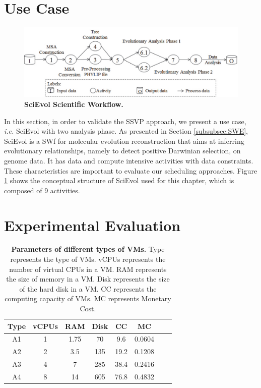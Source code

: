 \section{Use Case}
\label{sec:PUC}

\begin{figure}[htbp]
\begin{centering}
\captionsetup{justification=centering}
\includegraphics[width=140mm]{figures/pscievol}
\par\end{centering}
\caption{\textbf{SciEvol Scientific Workflow. }}
\label{fig:pscievol}
\end{figure}

In this section, in order to validate the SSVP approach, we present a use case, \textit{i.e.} SciEvol with two analysis phase.
As presented in Section \ref{subsubsec:SWE}, SciEvol \cite{Ocana2012} is a SWf for molecular evolution reconstruction that aims at inferring evolutionary relationships, namely to detect positive Darwinian selection, on genome data. It has data and compute intensive activities with data constraints. These characteristics are important to evaluate our scheduling approaches. Figure \ref{fig:pscievol} shows the conceptual structure of SciEvol used for this chapter, which is composed of $9$ activities.


\section{Experimental Evaluation}
\label{sec:PVal}


\begin{table}[htbp]
\caption{\textbf{Parameters of different types of VMs. } Type represents the type of VMs. vCPUs represents the number of virtual CPUs in a VM. RAM represents the size of memory in a VM. Disk represents the size of the hard disk in a VM. CC represents the computing capacity of VMs. MC represents Monetary Cost.} 
\label{tab:pVMP}
\begin{centering}
\captionsetup{justification=centering}
\begin{tabular}{|c|c|c|c|c|c|c|c|}
\hline 
Type & vCPUs & RAM & Disk & CC & MC \tabularnewline
\hline 
A1 & 1 & 1.75 & 70 & 9.6 & 0.0604 \tabularnewline
A2 & 2 & 3.5 & 135 & 19.2 & 0.1208\tabularnewline
A3 & 4 & 7 & 285 & 38.4 & 0.2416 \tabularnewline
A4 & 8 & 14 & 605 & 76.8 & 0.4832 \tabularnewline
\hline 
\end{tabular}
\par\end{centering} 
\end{table}

